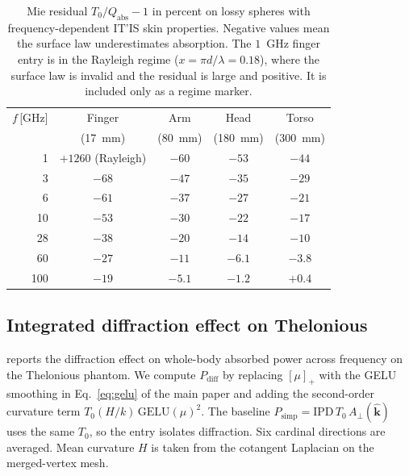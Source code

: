 \documentclass[journal,twocolumn,10pt]{IEEEtran}
\theoremstyle{plain}
\theoremstyle{remark}
\newcommand{\khat}{\hat{\bm{k}}}
\newcommand{\IPD}{\mathrm{IPD}}
\newcommand{\Aperp}{A_\perp}
\newcommand{\pospart}[1]{\left[#1\right]_{+}}
\begin{document}
\begin{table}[!t]
\centering
\footnotesize
\caption{Mie residual $T_0/Q_{\mathrm{abs}} - 1$ in percent on
lossy spheres with frequency-dependent IT'IS skin properties.
Negative values mean the surface law underestimates absorption.
The $1$~GHz finger entry is in the Rayleigh regime
($x = \pi d/\lambda = 0.18$), where the surface law is invalid and
the residual is large and positive. It is included only as a regime
marker.}
\label{tab:mie-residual}
\setlength{\tabcolsep}{4pt}
\begin{tabular}{rcccc}
\toprule
$f$\,[GHz] & Finger & Arm & Head & Torso \\
           & (17~mm) & (80~mm) & (180~mm) & (300~mm) \\
\midrule
1   & $+1260$ (Rayleigh) & $-60$ & $-53$ & $-44$ \\
3   & $-68$ & $-47$ & $-35$ & $-29$ \\
6   & $-61$ & $-37$ & $-27$ & $-21$ \\
10  & $-53$ & $-30$ & $-22$ & $-17$ \\
28  & $-38$ & $-20$ & $-14$ & $-10$ \\
60  & $-27$ & $-11$ & $-6.1$ & $-3.8$ \\
100 & $-19$ & $-5.1$ & $-1.2$ & $+0.4$ \\
\bottomrule
\end{tabular}
\end{table}


\subsection{Integrated diffraction effect on Thelonious}\label{si:diffraction-integrated}
 reports the diffraction effect on whole-body
absorbed power across frequency on the Thelonious phantom. We compute
$P_{\mathrm{diff}}$ by replacing $\pospart{\mu}$ with the GELU
smoothing in Eq.~\ref{eq:gelu} of the main paper and adding the
second-order curvature term $T_0(H/k)\,\mathrm{GELU}(\mu)^2$. The baseline $P_{\mathrm{simp}} =
\IPD\,T_0\,\Aperp(\khat)$ uses the same $T_0$, so the entry isolates
diffraction. Six cardinal directions are averaged. Mean curvature $H$
is taken from the cotangent Laplacian on the merged-vertex mesh.
\end{document}
